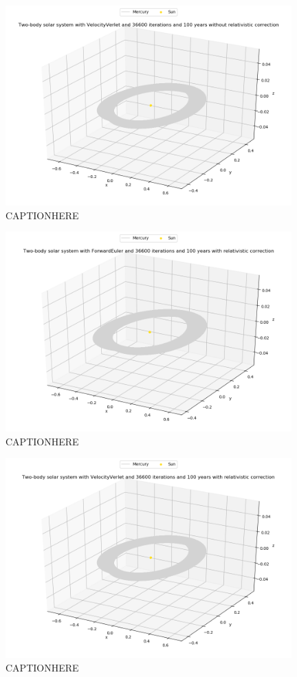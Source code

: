 \documentclass{article}
\begin{document}
    \begin{figure}[H]
        \centering
        \includegraphics[width = 11cm]{img/plot3D_S_M_V_n36600_yr100_newton.png}
        \caption{CAPTIONHERE}
        \label{fig:plot3D_S_M_V_n36600_yr100_newton}
    \end{figure}

    \begin{figure}[H]
        \centering
        \includegraphics[width = 11cm]{img/plot3D_S_M_F_n36600_yr100.png}
        \caption{CAPTIONHERE}
        \label{fig:plot3D_S_M_F_n36600_yr100}
    \end{figure}

    \begin{figure}[H]
        \centering
        \includegraphics[width = 11cm]{img/plot3D_S_M_V_n36600_yr100.png}
        \caption{CAPTIONHERE}
        \label{fig:plot3D_S_M_V_n36600_yr100}
    \end{figure}
\end{document}
